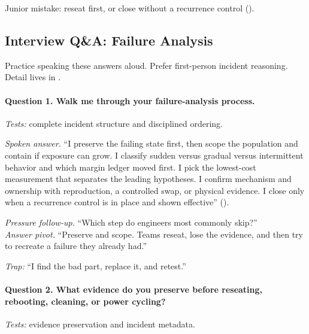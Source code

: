 
Junior mistake: reseat first, or close without a recurrence control
().

\subsection{Interview Q\&A: Failure Analysis}
\label{sec:failure-analysis-interview-qa}

Practice speaking these answers aloud. Prefer first-person incident reasoning.
Detail lives in
.

\paragraph{Question 1. Walk me through your failure-analysis process.}
\textit{Tests:} complete incident structure and disciplined ordering.

\textit{Spoken answer.}
``I preserve the failing state first, then scope the population and contain if
exposure can grow. I classify sudden versus gradual versus intermittent behavior
and which margin ledger moved first. I pick the lowest-cost measurement that
separates the leading hypotheses. I confirm mechanism and ownership with
reproduction, a controlled swap, or physical evidence. I close only when a
recurrence control is in place and shown effective''
().

\textit{Pressure follow-up.} ``Which step do engineers most commonly skip?''\\
\textit{Answer pivot.} ``Preserve and scope. Teams reseat, lose the evidence,
and then try to recreate a failure they already had.''

\textit{Trap:} ``I find the bad part, replace it, and retest.''

\paragraph{Question 2. What evidence do you preserve before reseating, rebooting,
cleaning, or power cycling?}
\textit{Tests:} evidence preservation and incident metadata.

